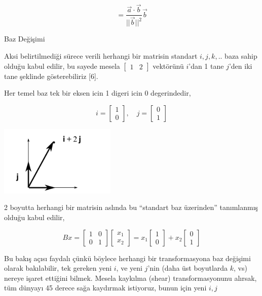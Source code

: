 \documentclass[12pt,fleqn]{article}\usepackage{../../common}
\begin{document}
$$
= \frac{\vec{a}\cdot\vec{b}}{||\vec{b}||^2} \vec{b}
$$

Baz Değişimi

Aksi belirtilmediği sürece verili herhangi bir matrisin standart $i,j,k,..$ baza
sahip olduğu kabul edilir, bu sayede mesela $[\begin{array}{cc}1&2\end{array}]$
vektörünü $i$'dan 1 tane $j$'den iki tane şeklinde gösterebiliriz [6].

Her temel baz tek bir eksen icin 1 digeri icin 0 degerindedir,

$$
i = \left[\begin{array}{c}1 \\ 0 \end{array}\right], \quad
j = \left[\begin{array}{c}0 \\ 1 \end{array}\right]
$$

\includegraphics[width=15em]{ijbasis.png}

2 boyutta herhangi bir matrisin aslında bu ``standart baz üzerinden''
tanımlanmış olduğu kabul edilir,

$$
Bx = 
\left[\begin{array}{ccc}
1 & 0 \\ 0 & 1
\end{array}\right]
\left[\begin{array}{c}
x_1 \\ x_2
\end{array}\right] =
x_1 \left[\begin{array}{c}
1 \\ 0
\end{array}\right] +
x_2 \left[\begin{array}{c}
0 \\ 1
\end{array}\right]
$$

Bu bakış açısı faydalı çünkü böylece herhangi bir transformasyona baz değişimi
olarak bakılabilir, tek gereken yeni $i$, ve yeni $j$'nin (daha üst boyutlarda
$k$, vs) nereye işaret ettiğini bilmek. Mesela kaykılma (shear)
transformasyonunu alırsak, tüm dünyayı 45 derece sağa kaydırmak istiyoruz, bunun
için yeni $i,j$
\end{document}

